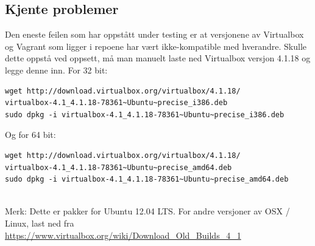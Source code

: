 \documentclass{article}
\begin{document}
\subsection{Kjente problemer}
Den eneste feilen som har oppstått under testing er at versjonene av Virtualbox og Vagrant som ligger i repoene har vært ikke-kompatible med hverandre. Skulle dette oppstå ved oppsett, må man manuelt laste ned Virtualbox versjon 4.1.18 og legge denne inn. For 32 bit: 
\begin{lstlisting}
wget http://download.virtualbox.org/virtualbox/4.1.18/
virtualbox-4.1_4.1.18-78361~Ubuntu~precise_i386.deb
sudo dpkg -i virtualbox-4.1_4.1.18-78361~Ubuntu~precise_i386.deb
\end{lstlisting}
Og for 64 bit:
\\ 
\begin{lstlisting}
wget http://download.virtualbox.org/virtualbox/4.1.18/
virtualbox-4.1_4.1.18-78361~Ubuntu~precise_amd64.deb
sudo dpkg -i virtualbox-4.1_4.1.18-78361~Ubuntu~precise_amd64.deb
\end{lstlisting}
\\ 
Merk: Dette er pakker for Ubuntu 12.04 LTS. For andre versjoner av OSX / Linux, last ned fra \\
\url{https://www.virtualbox.org/wiki/Download_Old_Builds_4_1}
\end{document}
